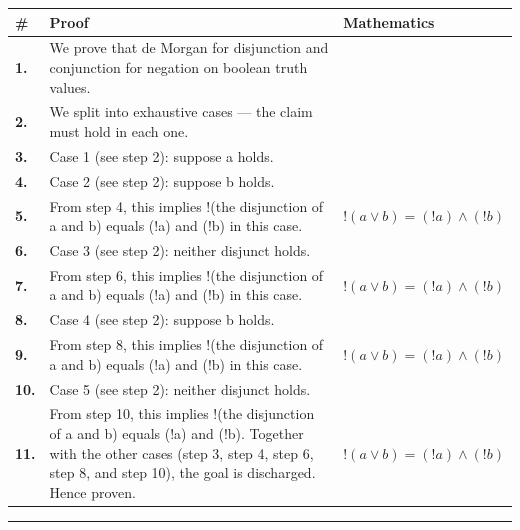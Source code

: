 \documentclass[11pt]{article}
\theoremstyle{definition}
\begin{document}
\begin{tabular}{@{} >{\raggedright\arraybackslash}p{} >{\raggedright\arraybackslash}p{} >{\raggedleft\arraybackslash}p{} @{}}
\textbf{\#} & \textbf{Proof} & \textbf{Mathematics} \\
\midrule
\textbf{1.} & We prove that de Morgan for disjunction and conjunction for negation on boolean truth values. & \\[0.45em]
\textbf{2.} & We split into exhaustive cases — the claim must hold in each one. & \\[0.45em]
\textbf{3.} & Case 1 (see step 2): suppose a holds. & \\[0.45em]
\textbf{4.} & Case 2 (see step 2): suppose b holds. & \\[0.45em]
\textbf{5.} & From step 4, this implies !(the disjunction of a and b) equals (!a) and (!b) in this case. & $\displaystyle !(a \lor b) = (!a) \land (!b)$ \\[0.45em]
\textbf{6.} & Case 3 (see step 2): neither disjunct holds. & \\[0.45em]
\textbf{7.} & From step 6, this implies !(the disjunction of a and b) equals (!a) and (!b) in this case. & $\displaystyle !(a \lor b) = (!a) \land (!b)$ \\[0.45em]
\textbf{8.} & Case 4 (see step 2): suppose b holds. & \\[0.45em]
\textbf{9.} & From step 8, this implies !(the disjunction of a and b) equals (!a) and (!b) in this case. & $\displaystyle !(a \lor b) = (!a) \land (!b)$ \\[0.45em]
\textbf{10.} & Case 5 (see step 2): neither disjunct holds. & \\[0.45em]
\textbf{11.} & From step 10, this implies !(the disjunction of a and b) equals (!a) and (!b). Together with the other cases (step 3, step 4, step 6, step 8, and step 10), the goal is discharged. Hence proven. & $\displaystyle !(a \lor b) = (!a) \land (!b)$ \\[0.45em]
\bottomrule
\end{tabular}
\label{thm:Bool-negation-de_morgan_for_disjunction_and_conjunction}
\par\medskip\hrule
\end{document}
